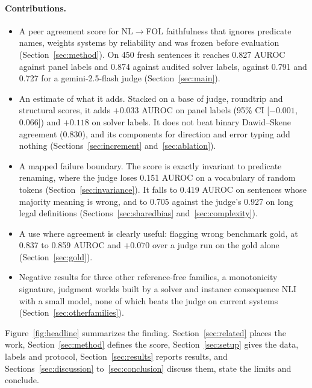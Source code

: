 \documentclass[11pt,letterpaper]{article}
\begin{document}
\paragraph{Contributions.}
\begin{itemize}
  \item A peer agreement score for NL$\rightarrow$FOL faithfulness that ignores predicate names, weights systems by reliability and was frozen before evaluation (Section~\ref{sec:method}). On 450 fresh sentences it reaches 0.827 AUROC against panel labels and 0.874 against audited solver labels, against 0.791 and 0.727 for a gemini-2.5-flash judge (Section~\ref{sec:main}).
  \item An estimate of what it adds. Stacked on a base of judge, roundtrip and structural scores, it adds $+0.033$ AUROC on panel labels (95\% CI [$-0.001$, 0.066]) and $+0.118$ on solver labels. It does not beat binary Dawid--Skene agreement (0.830), and its components for direction and error typing add nothing (Sections~\ref{sec:increment} and~\ref{sec:ablation}).
  \item A mapped failure boundary. The score is exactly invariant to predicate renaming, where the judge loses 0.151 AUROC on a vocabulary of random tokens (Section~\ref{sec:invariance}). It falls to 0.419 AUROC on sentences whose majority meaning is wrong, and to 0.705 against the judge's 0.927 on long legal definitions (Sections~\ref{sec:sharedbias} and~\ref{sec:complexity}).
  \item A use where agreement is clearly useful: flagging wrong benchmark gold, at 0.837 to 0.859 AUROC and $+0.070$ over a judge run on the gold alone (Section~\ref{sec:gold}).
  \item Negative results for three other reference-free families, a monotonicity signature, judgment worlds built by a solver and instance consequence NLI with a small model, none of which beats the judge on current systems (Section~\ref{sec:otherfamilies}).
\end{itemize}

Figure~\ref{fig:headline} summarizes the finding. Section~\ref{sec:related} places the work, Section~\ref{sec:method} defines the score, Section~\ref{sec:setup} gives the data, labels and protocol, Section~\ref{sec:results} reports results, and Sections~\ref{sec:discussion} to~\ref{sec:conclusion} discuss them, state the limits and conclude.
\end{document}
